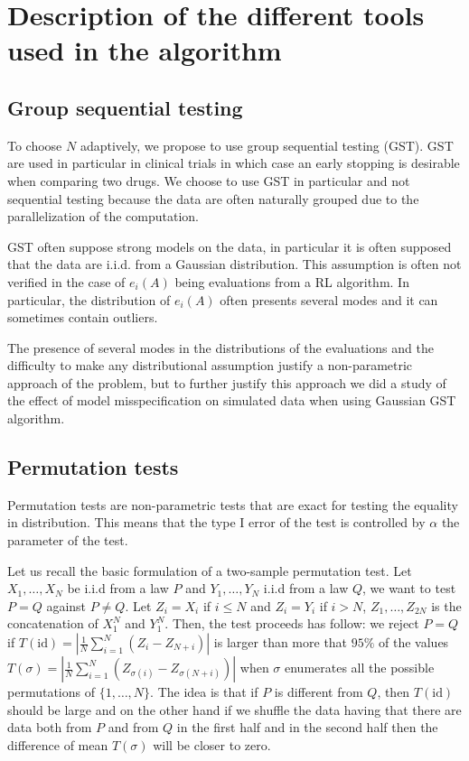 \documentclass{article}
\theoremstyle{plain}
\theoremstyle{remark}
\newcommand{\1}{\mathbbm{1}}
\newcommand{\id}{\mathrm{id}}
\newcommand{\todoT}[1]{\todo[inline,color=blue!40]{{\textbf{T:}~}#1}}
\numberwithin{equation}{section}
\begin{document}
\section{Description of the different tools used in the algorithm}
\subsection{Group sequential testing}

To choose $N$ adaptively, we propose to use group sequential testing (GST). GST are used in particular in clinical trials in which case an early stopping is desirable when comparing two drugs. We choose to use GST in particular and not sequential testing because the data are often naturally grouped due to the parallelization of the computation.

GST often suppose strong models on the data, in particular it is often supposed that the data are i.i.d. from a Gaussian distribution. This assumption is often not verified in the case of $e_i(A)$ being evaluations from a RL algorithm. In particular, the distribution of $e_i(A)$ often presents several modes and it can sometimes contain outliers.

The presence of several modes in the distributions of the evaluations and the difficulty to make any distributional assumption justify a non-parametric approach of the problem, but to further justify this approach we did a study of the effect of model misspecification on simulated data when using Gaussian GST algorithm.

\todoT{Explain early accept also} 

\subsection{Permutation tests}
Permutation tests are non-parametric tests that are exact for testing the equality in distribution. This means that the type I error of the test is controlled by $\alpha$ the parameter of the test.

Let us recall the basic formulation of a two-sample permutation test. Let $X_1,\dots,X_N$ be i.i.d from a law $P$ and $Y_1,\dots,Y_N$ i.i.d from a law $Q$, we want to test $P=Q$ against $P \neq Q$. Let $Z_i = X_i$ if $i\le N$ and $Z_i = Y_i$ if $i>N$, $Z_1,\dots,Z_{2N}$ is the concatenation of $X_1^N$ and $Y_1^N$. Then, the test proceeds has follow: we reject $P=Q$ if $T(\id) = \left| \frac{1}{N}\sum_{i=1}^N(Z_i-Z_{N+i})\right|$ is larger than more that $95\%$ of the values $T(\sigma) =  \left| \frac{1}{N}\sum_{i=1}^N(Z_{\sigma(i)}-Z_{\sigma(N+i)})\right|$ when $\sigma$ enumerates all the possible permutations of $\{1,\dots,N\}$. The idea is that if $P$ is different from $Q$, then $T(\id)$ should be large and on the other hand if we shuffle the data having that there are data both from $P$ and from $Q$ in the first half and in the second half then the difference of mean $T(\sigma)$ will be closer to zero.
\end{document}

